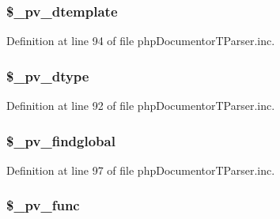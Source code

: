 \hypertarget{classphp_documentor_t_parser_a285853e7c973de440bc4ba4abcbdabc8}{
\subsubsection[{\$\-\_\-pv\-\_\-dtemplate}]{\setlength{\rightskip}{0pt plus 5cm}\$\-\_\-pv\-\_\-dtemplate}}\label{classphp_documentor_t_parser_a285853e7c973de440bc4ba4abcbdabc8}


\-Definition at line 94 of file php\-Documentor\-T\-Parser.\-inc.

\hypertarget{classphp_documentor_t_parser_ab3806c098e056d74eb80f0127c369f1e}{
\subsubsection[{\$\-\_\-pv\-\_\-dtype}]{\setlength{\rightskip}{0pt plus 5cm}\$\-\_\-pv\-\_\-dtype}}\label{classphp_documentor_t_parser_ab3806c098e056d74eb80f0127c369f1e}


\-Definition at line 92 of file php\-Documentor\-T\-Parser.\-inc.

\hypertarget{classphp_documentor_t_parser_a86a9d8a99c52e7b23bdad628e991d0ad}{
\subsubsection[{\$\-\_\-pv\-\_\-findglobal}]{\setlength{\rightskip}{0pt plus 5cm}\$\-\_\-pv\-\_\-findglobal}}\label{classphp_documentor_t_parser_a86a9d8a99c52e7b23bdad628e991d0ad}


\-Definition at line 97 of file php\-Documentor\-T\-Parser.\-inc.

\hypertarget{classphp_documentor_t_parser_a951809946826f564f1fe9d448e54138f}{
\subsubsection[{\$\-\_\-pv\-\_\-func}]{\setlength{\rightskip}{0pt plus 5cm}\$\-\_\-pv\-\_\-func}}\label{classphp_documentor_t_parser_a951809946826f564f1fe9d448e54138f}


